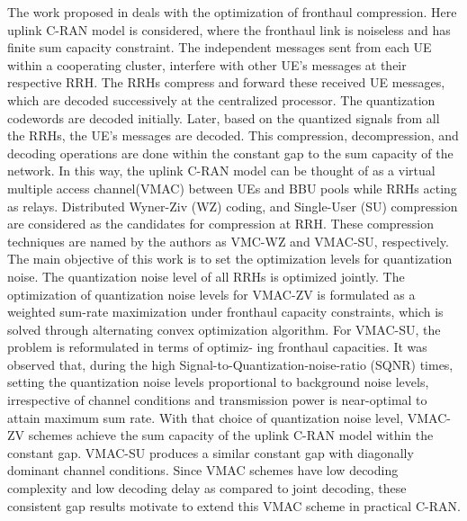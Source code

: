 \begin{multicols}{2}
\begin{itemize}
The work proposed in \cite{art3-key53} deals with the optimization of fronthaul compression. Here uplink C-RAN model is considered, where the fronthaul link is noiseless and has finite sum capacity constraint. The independent messages sent from each UE within a cooperating cluster, interfere with other UE’s messages at their respective RRH. The RRHs compress and forward these received UE messages, which are decoded successively at the centralized processor. The quantization codewords are decoded initially. Later, based on the quantized signals from all the RRHs, the UE’s messages are decoded. This compression, decompression, and decoding operations are done within the constant gap to the sum capacity of the network. In this way, the uplink C-RAN model can be thought of as a virtual multiple access channel(VMAC) between UEs and BBU pools while RRHs acting as relays. Distributed Wyner-Ziv (WZ) coding, and Single-User (SU) compression are considered as the candidates for compression at RRH. These compression techniques are named by the authors as VMC-WZ and VMAC-SU, respectively. The main objective of this work is to set the optimization levels for quantization noise. The quantization noise level of all RRHs is optimized jointly. The optimization of quantization noise levels for VMAC-ZV is formulated as a weighted sum-rate maximization under fronthaul capacity constraints, which is solved through alternating convex optimization algorithm. For VMAC-SU, the problem is reformulated in terms of optimiz- ing fronthaul capacities. It was observed that, during the high Signal-to-Quantization-noise-ratio (SQNR) times, setting the quantization noise levels proportional to background noise levels, irrespective of channel conditions and transmission power is near-optimal to attain maximum sum rate. With that choice of quantization noise level, VMAC-ZV schemes achieve the sum capacity of the uplink C-RAN model within the constant gap. VMAC-SU produces a similar constant gap with diagonally dominant channel conditions. Since VMAC schemes have low decoding complexity and low decoding delay as compared to joint decoding, these consistent gap results motivate to extend this VMAC scheme in practical C-RAN.


\end{itemize}
\end{multicols}
